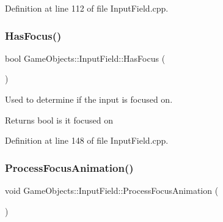 Definition at line 112 of file Input\+Field.\+cpp.


\begin{DoxyCode}{0}

\end{DoxyCode}
\mbox{\label{class_game_objects_1_1_input_field_a2d50c951daa79d6afdf47b6afb0d7c3f}} 
\subsubsection{\texorpdfstring{HasFocus()}{HasFocus()}}
{\footnotesize\ttfamily bool Game\+Objects\+::\+Input\+Field\+::\+Has\+Focus (\begin{DoxyParamCaption}{ }\end{DoxyParamCaption})}



Used to determine if the input is focused on. 

\begin{DoxyReturn}{Returns}
bool is it focused on \begin{DoxyVerb}\end{DoxyVerb}
 
\end{DoxyReturn}


Definition at line 148 of file Input\+Field.\+cpp.


\begin{DoxyCode}{0}

\end{DoxyCode}
\mbox{\label{class_game_objects_1_1_input_field_adc1c1e00c8114cdf5278fff4ae070076}} 
\subsubsection{\texorpdfstring{ProcessFocusAnimation()}{ProcessFocusAnimation()}}
{\footnotesize\ttfamily void Game\+Objects\+::\+Input\+Field\+::\+Process\+Focus\+Animation (\begin{DoxyParamCaption}{ }\end{DoxyParamCaption})}



